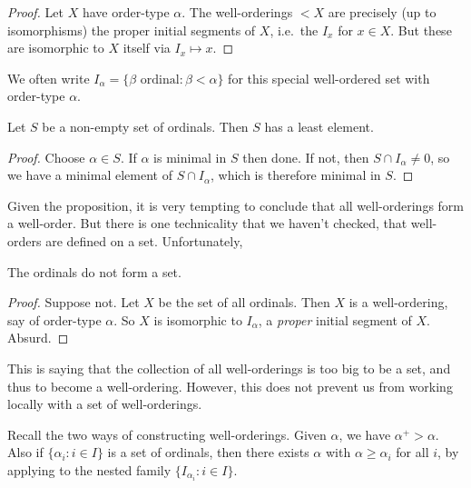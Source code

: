 \documentclass[a4paper]{article}
\begin{document}
\begin{proof}
  Let \(X\) have order-type \(\alpha\). The well-orderings \(< X\) are precisely (up to isomorphisms) the proper initial segments of \(X\), i.e.\ the \(I_x\) for \(x \in X\). But these are isomorphic to \(X\) itself via \(I_x \mapsto x\).
\end{proof}

\begin{notation}
  We often write \(I_\alpha = \{\beta \text{ ordinal}: \beta < \alpha\}\) for this special well-ordered set with order-type \(\alpha\).
\end{notation}

\begin{proposition}
  \label{prop:set of ordinals is well-ordered}
  Let \(S\) be a non-empty set of ordinals. Then \(S\) has a least element.
\end{proposition}

\begin{proof}
  Choose \(\alpha \in S\). If \(\alpha\) is minimal in \(S\) then done. If not, then \(S \cap I_\alpha \neq 0\), so we have a minimal element of \(S \cap I_\alpha\), which is therefore minimal in \(S\).
\end{proof}

Given the proposition, it is very tempting to conclude that all well-orderings form a well-order. But there is one technicality that we haven't checked, that well-orders are defined on a set. Unfortunately,

\begin{theorem}
  The ordinals do not form a set.
\end{theorem}

\begin{proof}
  Suppose not. Let \(X\) be the set of all ordinals. Then \(X\) is a well-ordering, say of order-type \(\alpha\). So \(X\) is isomorphic to \(I_\alpha\), a \emph{proper} initial segment of \(X\). Absurd.
\end{proof}

This is saying that the collection of all well-orderings is too big to be a set, and thus to become a well-ordering. However, this does not prevent us from working locally with a set of well-orderings.

Recall the two ways of constructing well-orderings. Given \(\alpha\), we have \(\alpha^+ > \alpha\). Also if \(\{\alpha_i: i \in I\}\) is a set of ordinals, then there exists \(\alpha\) with \(\alpha \geq \alpha_i\) for all \(i\), by applying  to the nested family \(\{I_{\alpha_i}: i \in I\}\).
\end{document}
